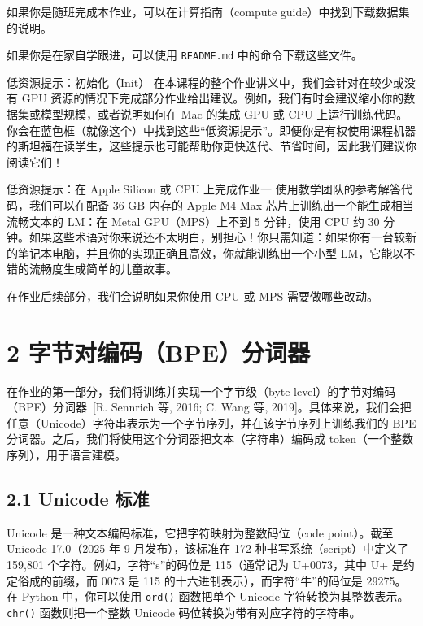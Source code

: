 如果你是随班完成本作业，可以在计算指南（compute guide）中找到下载数据集的说明。

如果你是在家自学跟进，可以使用 \texttt{README.md} 中的命令下载这些文件。

\begin{tipbox}{低资源提示：初始化（Init）}
在本课程的整个作业讲义中，我们会针对在较少或没有 GPU 资源的情况下完成部分作业给出建议。例如，我们有时会建议缩小你的数据集或模型规模，或者说明如何在 Mac 的集成 GPU 或 CPU 上运行训练代码。你会在蓝色框（就像这个）中找到这些“低资源提示”。即便你是有权使用课程机器的斯坦福在读学生，这些提示也可能帮助你更快迭代、节省时间，因此我们建议你阅读它们！
\end{tipbox}

\begin{tipbox}{低资源提示：在 Apple Silicon 或 CPU 上完成作业一}
使用教学团队的参考解答代码，我们可以在配备 36 GB 内存的 Apple M4 Max 芯片上训练出一个能生成相当流畅文本的 LM：在 Metal GPU（MPS）上不到 5 分钟，使用 CPU 约 30 分钟。如果这些术语对你来说还不太明白，别担心！你只需知道：如果你有一台较新的笔记本电脑，并且你的实现正确且高效，你就能训练出一个小型 LM，它能以不错的流畅度生成简单的儿童故事。

在作业后续部分，我们会说明如果你使用 CPU 或 MPS 需要做哪些改动。
\end{tipbox}

\section*{2 字节对编码（BPE）分词器}

在作业的第一部分，我们将训练并实现一个字节级（byte-level）的字节对编码（BPE）分词器 \,[R. Sennrich 等, 2016; C. Wang 等, 2019]。具体来说，我们会把任意（Unicode）字符串表示为一个字节序列，并在该字节序列上训练我们的 BPE 分词器。之后，我们将使用这个分词器把文本（字符串）编码成 token（一个整数序列），用于语言建模。

\subsection*{2.1 Unicode 标准}

Unicode 是一种文本编码标准，它把字符映射为整数码位（code point）。截至 Unicode 17.0（2025 年 9 月发布），该标准在 172 种书写系统（script）中定义了 159{,}801 个字符。例如，字符“s”的码位是 115（通常记为 U+0073，其中 U+ 是约定俗成的前缀，而 0073 是 115 的十六进制表示），而字符“牛”的码位是 29275。在 Python 中，你可以使用 \texttt{ord()} 函数把单个 Unicode 字符转换为其整数表示。\texttt{chr()} 函数则把一个整数 Unicode 码位转换为带有对应字符的字符串。

